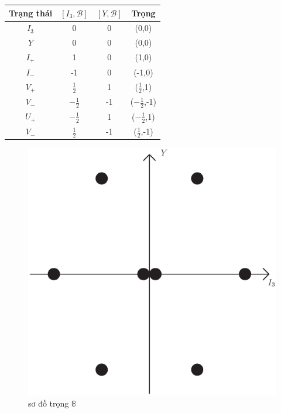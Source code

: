 \documentclass{report}
\begin{document}
	\begin{center}
		\begin{tabular}{ |c|c|c|c| }
			\hline
 				Trạng thái &  \( \left[ I_{3}, \mathcal{B} \right] \) &  \( \left[ Y, \mathcal{B} \right] \) & Trọng \\
 			\hline
 				\( I_{3} \) & 0 & 0 & (0,0) \\
			\hline
 				\( Y \) & 0 & 0 & (0,0) \\
			\hline
				\( I_{+} \) & 1 & 0 & (1,0) \\	
			\hline
				\( I_{-} \) & -1 & 0 & (-1,0) \\	
			\hline
				\( V_{+} \) & \( \frac{1}{2} \) & 1 & (\( \frac{1}{2} \),1) \\	
			\hline
				\( V_{-} \) & \( - \frac{1}{2} \) & -1 & (\( - \frac{1}{2} \),-1) \\	
			\hline
				\( U_{+} \) & \( - \frac{1}{2} \) & 1 & (\( - \frac{1}{2} \),1) \\	
			\hline
				\( V_{-} \) & \( \frac{1}{2} \) & -1 & (\( \frac{1}{2} \),-1) \\	
			\hline
	\end{tabular}
	\end{center}	
	
	\begin{figure}[!htb]
		\centering
		\includegraphics[scale=0.5]{diagram1.eps}
		\caption{sơ đồ trọng \(\mathbb{8}\)}
	\end{figure}	
	
\end{document}
